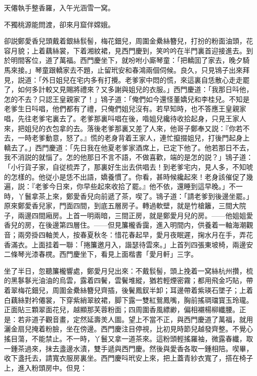 天僊執手整香羅，入午光涵雪一窝。

不獨桃源能問渡，卻來月窟伴嫦娥。

卻説鄭愛香兒頭戴着銀絲䯼髻，梅花鈿兒，周圍金纍絲簪兒，打扮的粉面油頭，花容月貌；上着藕絲裳，下着湘紋裙，見西門慶到，笑吟吟在半門裏首迎接進去。到於明間客位，道了萬福。西門慶坐下，就吩咐小廝琴童：「把轎囬了家去，晚夕騎馬來接。」琴童跟轎家去不題，止留玳安和春鴻兩個伺候。良久，只見鴇子出來拜見，説道：「外日姐兒在宅内多有打攪。老爹家中悶的慌，來這裏自恁散心走走罷了，如何多計較又見賜將禮來？又多謝與姐兒的衣服。」西門慶道：「我那日呌他，怎的不去？只認王皇親家了！」鴇子道：「俺們如今還怪董嬌兒和李桂兒。不知是老爹生日呌唱，他們都有了禮，只俺們姐兒沒有。若早知時，也不答應王皇親家唱，先往老爹宅裏去了。老爹那裏呌唱在後，喒姐兒纔待收拾起身，只見王家人來，把姐兒的衣包拿的去。落後老爹那裏又差了人來，他哥子鄭奉又説：『你若不去，一時老爹動意，怒了。』慌的老身背着王家人，連忙攛掇姐兒，打後門起身上轎去了。」西門慶道：「先日我在他夏老爹家酒席上，已定下他了。他若那日不去，我不消説的就惱了。怎的他那日不言不語，不做喜歡，端的是怎的説？」鴇子道：「小行貨子家，自従梳弄了，那裏好生出去供唱去！到老爹宅内，見人多，不知唬的怎樣的。他従小是恁不出語，嬌養慣了。你看，甚時候纔起來！老身該催促了幾遍，説：『老爹今日來，你早些起來收拾了罷。』他不依，還睡到這早晚。」不一時，丫鬟拿茶上來，鄭愛香兒向前遞了茶，喫了。鴇子道：「請老爹到後邊坐罷。」原來鄭愛香兒家，門面四間，到底五層房子。轉過軟壁，就是竹槍籬，三間大院子，兩邊四間廂房。上首一明兩暗，三間正房，就是鄭愛月兒的房。——他姐姐愛香兒的房，在後邊第四層住。——但見簾櫳香靄，進入明間内，供養着一軸海潮觀音；兩旁掛四軸羙人，按春夏秋冬：惜花春起早，愛月夜眠遲，掬水月在手，弄花香滿衣。上面挂着一聯：「捲簾邀月入，諧瑟待雲來。」上首列四張東坡椅，兩邊安二條琴光漆春櫈。西門慶坐下，看見上面楷書「愛月軒」三字。

坐了半日，忽聽簾櫳響處，鄭愛月兒出來：不戴䯼髻，頭上挽着一窝絲杭州攢，梳的黑鬖鬖光油油的烏雲，露着四鬢，雲鬢堆縱，猶若輕煙密霧；都用飛金巧貼，帶着翠梅花鈿兒，周圍金纍絲簪兒齊插，後鬢鳳釵半卸；耳邊帶着紫瑛石墜子；上着白藕絲對衿僊裳，下穿紫綃翠紋裙，脚下露一雙紅鴛鳳嘴，胸前搖琱璫寳玉玲瓏。正面貼三顆翠面花兒，越顯那芙蓉粉面；四周圍香風縹緲，偏相襯楊柳纖腰。正是：若非道子觀音畫，定然延壽羙人圖。望上不當不正，與西門慶道了萬福，就用灑金扇兒掩着粉臉，坐在傍邊。西門慶注目停視，比初見時節兒越發齊整。不覺心搖目蕩，不能禁止。不一時，丫鬟又拿一道茶來。這粉頭輕搖羅袖，微露春纖，取一鍾茶過來，抹去盞邊水漬，雙手遞與西門慶。然後與愛香各取一鍾相陪。喫畢，收下盞托去，請寬衣服房裏坐。西門慶呌玳安上來，把上蓋青紗衣寬了，搭在椅子上，進入粉頭房中。但見：

